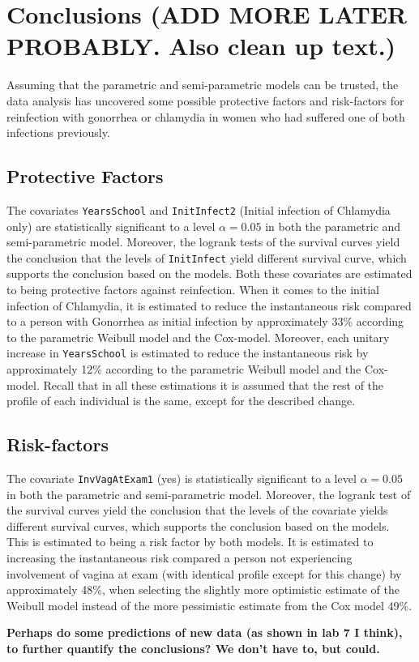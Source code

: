 \documentclass[
]{article}
\begin{document}
\hypertarget{conclusions-add-more-later-probably.-also-clean-up-text.}{%
\section{Conclusions (ADD MORE LATER PROBABLY. Also clean up text.)}\label{conclusions-add-more-later-probably.-also-clean-up-text.}}

Assuming that the parametric and semi-parametric models can be trusted, the data analysis has uncovered some possible protective factors and risk-factors for reinfection with gonorrhea or chlamydia in women who had suffered one of both infections previously.

\hypertarget{protective-factors}{%
\subsection{Protective Factors}\label{protective-factors}}

The covariates \texttt{YearsSchool} and \texttt{InitInfect2} (Initial infection of Chlamydia only) are statistically significant to a level \(\alpha = 0.05\) in both the parametric and semi-parametric model. Moreover, the logrank tests of the survival curves yield the conclusion that the levels of \texttt{InitInfect} yield different survival curve, which supports the conclusion based on the models. Both these covariates are estimated to being protective factors against reinfection. When it comes to the initial infection of Chlamydia, it is estimated to reduce the instantaneous risk compared to a person with Gonorrhea as initial infection by approximately 33\% according to the parametric Weibull model and the Cox-model. Moreover, each unitary increase in \texttt{YearsSchool} is estimated to reduce the instantaneous risk by approximately 12\% according to the parametric Weibull model and the Cox-model. Recall that in all these estimations it is assumed that the rest of the profile of each individual is the same, except for the described change.

\hypertarget{risk-factors}{%
\subsection{Risk-factors}\label{risk-factors}}

The covariate \texttt{InvVagAtExam1} (yes) is statistically significant to a level \(\alpha = 0.05\) in both the parametric and semi-parametric model. Moreover, the logrank test of the survival curves yield the conclusion that the levels of the covariate yields different survival curves, which supports the conclusion based on the models. This is estimated to being a risk factor by both models. It is estimated to increasing the instantaneous risk compared a person not experiencing involvement of vagina at exam (with identical profile except for this change) by approximately 48\%, when selecting the slightly more optimistic estimate of the Weibull model instead of the more pessimistic estimate from the Cox model 49\%.

\textbf{Perhaps do some predictions of new data (as shown in lab 7 I think), to further quantify the conclusions? We don't have to, but could.}
\end{document}
